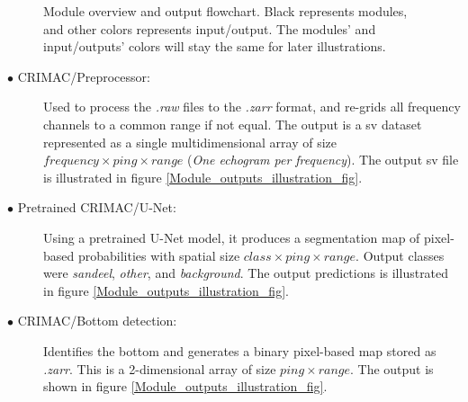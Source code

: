             \begin{figure}[H]   
                \centering
                
                \caption[Module overview]{Module overview and output flowchart. Black represents modules, and other colors represents input/output. The modules' and input/outputs' colors will stay the same for later illustrations.}
              	\medskip 
                \label{Module_overview_fig}
            \end{figure} 
            \begin{description}
            
              \item[$\bullet$ CRIMAC/Preprocessor:] Used to process the \textit{.raw} files to the \textit{.zarr} format, and re-grids all frequency channels to a common range if not equal. The output is a \gls{sv} dataset represented as a single multidimensional array of size $frequency \times ping \times range$ (\textit{One echogram per frequency}). The output \gls{sv} file is illustrated in figure \ref{Module_outputs_illustration_fig}.%
                
              \item[$\bullet$ Pretrained CRIMAC/U-Net:] Using a pretrained U-Net model, it produces a segmentation map of pixel-based probabilities with spatial size $class \times ping \times range$. Output classes were \textit{sandeel}, \textit{other}, and \textit{background}. The output predictions is illustrated in figure \ref{Module_outputs_illustration_fig}.
              
              
              \item[$\bullet$ CRIMAC/Bottom detection:] Identifies the bottom and generates a binary pixel-based map stored as \textit{.zarr}. This is a 2-dimensional array of size $ping \times range$. The output is shown in figure \ref{Module_outputs_illustration_fig}.

            \end{description}
        \clearpage

